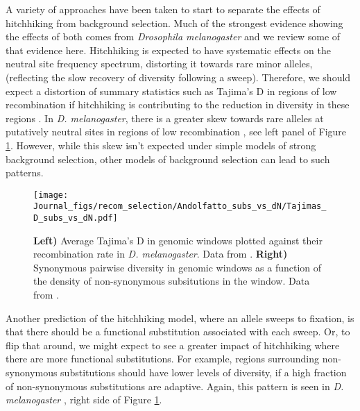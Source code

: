 A variety of approaches have been taken to start to separate the effects of hitchhiking from background
selection. Much of the
strongest evidence showing the effects of both comes from
\textit{Drosophila melanogaster} and we review some of that evidence here. 
Hitchhiking is expected to have systematic effects on the neutral site
frequency spectrum, distorting it towards rare minor alleles,
(reflecting the slow recovery of diversity following a
sweep). Therefore, we should expect a distortion of summary
statistics such as Tajima's D in regions of low recombination if
hitchhiking is contributing to the reduction in diversity in these
regions \citep{Braverman:95, Przeworski:02,Kim:06}. In \textit{D. melanogaster}, there is a greater skew towards rare
alleles at putatively neutral sites in regions of low recombination
\citep{Andolfatto:01,Shapiro:07}, see left panel of Figure
\ref{fig:Tajimas_D_dN_pi}. However, while this skew isn't expected under
simple models of strong background selection, other models of background selection
can lead to such patterns. 

\begin{figure}
\begin{center}
\texttt{[image: Journal\_figs/recom\_selection/Andolfatto\_subs\_vs\_dN/Tajimas\_D\_subs\_vs\_dN.pdf]}
\end{center}
\caption{{\bf Left)} Average Tajima's D in genomic windows plotted
  against their recombination rate in \textit{D. melanogaster}. Data
  from \citet{Shapiro:07}. {\bf Right)} Synonymous pairwise diversity
  in genomic windows  as a function of the density of non-synonymous
  subsitutions in the window. Data from \citet{Andolfatto:07}. } \label{fig:Tajimas_D_dN_pi}
\end{figure}

Another prediction of the hitchhiking model, where an allele sweeps to
fixation, is that there should be a functional substitution associated with each
sweep. Or, to flip that around, we might expect to see a greater impact
of hitchhiking where there are more functional substitutions. 
For example, regions surrounding non-synonymous substitutions should have lower levels of
diversity, if a high fraction of non-synonymous substitutions are adaptive. Again, this pattern is seen in \textit{D. melanogaster}
\citep{Andolfatto:07, Macpherson:07,Sattath:11}, right side of
Figure \ref{fig:Tajimas_D_dN_pi}.


